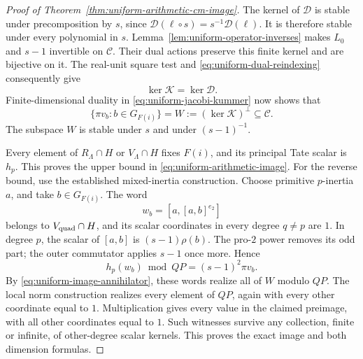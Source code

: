 \begin{proof}[Proof of Theorem~\ref{thm:uniform-arithmetic-cm-image}]
The kernel of \(\mathscr D\) is stable under precomposition
by \(s\), since
\(\mathscr D(\ell\circ s)=s^{-1}\mathscr D(\ell)\).
It is therefore stable under every polynomial in \(s\).
Lemma~\ref{lem:uniform-operator-inverses} makes \(L_0\)
and \(s-1\) invertible on \(\mathscr C\). Their dual actions
preserve this finite kernel and are bijective on it.
The real-unit square test and \eqref{eq:uniform-dual-reindexing}
consequently give
\[
 \ker\mathscr K=\ker\mathscr D.
\]
Finite-dimensional duality in \eqref{eq:uniform-jacobi-kummer}
now shows that
\begin{equation}
 \{\pi v_b:b\in G_{F(i)}\}
       =W:=(\ker\mathscr K)^\perp\subseteq\mathscr C.
 \label{eq:uniform-image-annihilator}
\end{equation}
The subspace \(W\) is stable under \(s\) and under
\((s-1)^{-1}\).

Every element of \(R_\Lambda\cap H\) or \(V_\Lambda\cap H\)
fixes \(F(i)\), and its principal Tate scalar is \(h_p\).
This proves the upper bound in
\eqref{eq:uniform-arithmetic-image}. For the reverse bound,
use the established mixed-inertia construction. Choose primitive
\(p\)-inertia \(a\), and take \(b\in G_{F(i)}\). The word
\[
 w_b=[a,[a,b]^{e_2}]
\]
belongs to \(V_{\rm quad}\cap H\), and its scalar coordinates
in every degree \(q\ne p\) are \(1\). In degree \(p\),
the scalar of \([a,b]\) is \((s-1)\rho(b)\).
The pro-\(2\) power removes its odd part; the outer commutator
applies \(s-1\) once more. Hence
\[
 h_p(w_b)\bmod QP=(s-1)^2\pi v_b.
\]
By \eqref{eq:uniform-image-annihilator}, these words realize
all of \(W\) modulo \(QP\). The local norm construction realizes
every element of \(QP\), again with every other coordinate
equal to \(1\). Multiplication gives every value in the claimed
preimage, with all other coordinates equal to \(1\).
Such witnesses survive any collection, finite or infinite,
of other-degree scalar kernels. This proves the exact image
and both dimension formulas.
\end{proof}

